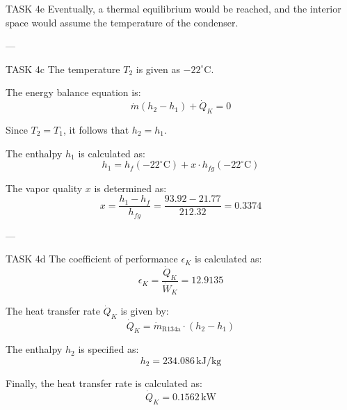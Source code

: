 TASK 4e  
Eventually, a thermal equilibrium would be reached, and the interior space would assume the temperature of the condenser.

---

TASK 4c  
The temperature \( T_2 \) is given as \( -22^\circ\text{C} \).

The energy balance equation is:  
\[
\dot{m} (h_2 - h_1) + \dot{Q}_K = 0
\]

Since \( T_2 = T_1 \), it follows that \( h_2 = h_1 \).

The enthalpy \( h_1 \) is calculated as:  
\[
h_1 = h_f(-22^\circ\text{C}) + x \cdot h_{fg}(-22^\circ\text{C})
\]

The vapor quality \( x \) is determined as:  
\[
x = \frac{h_1 - h_f}{h_{fg}} = \frac{93.92 - 21.77}{212.32} = 0.3374
\]

---

TASK 4d  
The coefficient of performance \( \epsilon_K \) is calculated as:  
\[
\epsilon_K = \frac{\dot{Q}_K}{\dot{W}_K} = 12.9135
\]

The heat transfer rate \( \dot{Q}_K \) is given by:  
\[
\dot{Q}_K = \dot{m}_{\text{R134a}} \cdot (h_2 - h_1)
\]

The enthalpy \( h_2 \) is specified as:  
\[
h_2 = 234.086 \, \text{kJ/kg}
\]

Finally, the heat transfer rate is calculated as:  
\[
\dot{Q}_K = 0.1562 \, \text{kW}
\]
